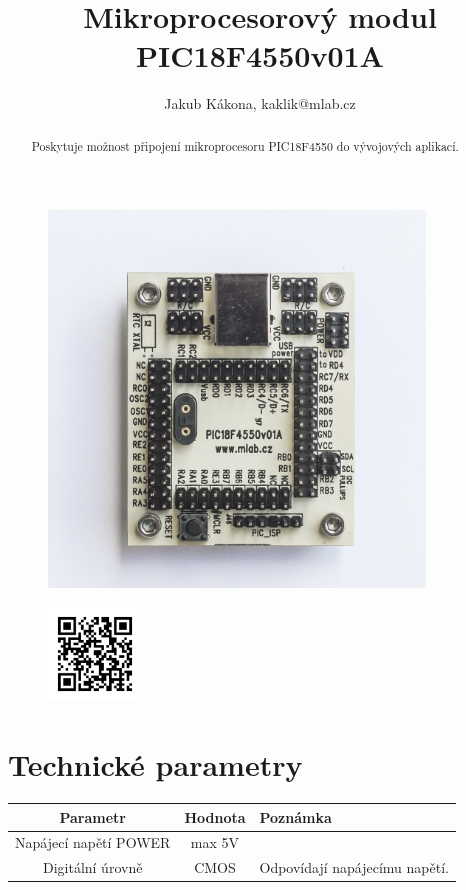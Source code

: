 \documentclass[12pt,a4paper,oneside]{article}
\begin{document}
\title{Mikroprocesorový modul PIC18F4550v01A}
\author{Jakub Kákona, kaklik@mlab.cz}
\maketitle

\thispagestyle{empty}
\begin{abstract}
Poskytuje možnost připojení mikroprocesoru PIC18F4550 do vývojových aplikací.
\end{abstract}

\begin{figure} [htbp]
\begin{center}
\includegraphics [width=100mm] {./img/PIC18F4550v01A_Top_Big.jpg} 
\end{center}
\end{figure}

\begin{figure} [b]
\includegraphics [width=25mm] {./img/PIC18F4550v01A_QRcode.png} 
\end{figure}

\newpage
\tableofcontents

\section{Technické parametry}
\begin{table}[htbp]
\begin{center}
\begin{tabular}{|c|c|p{4.7cm}|}
\hline
Parametr & Hodnota & Poznámka \\
\hline
Napájecí napětí POWER  & max 5V & \\ 
\hline
Digitální úrovně & CMOS &  Odpovídají napájecímu napětí. \\ 
\hline
\end{tabular}
\end{center}
\end{table}
\end{document}
